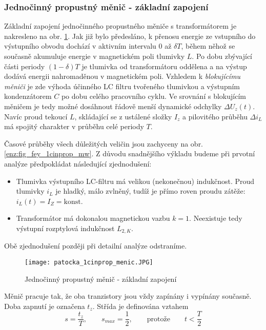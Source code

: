     \subsubsection{Jednočinný propustný měnič - základní zapojení}
      Základní zapojení jednočinného propustného měniče s transformátorem je nakresleno na obr. 
      \ref{enz:fig_fey_1cinprop_m}. Jak již bylo předesláno, k přenosu energie ze vstupního do 
      výstupního obvodu dochází v aktivním intervalu \(0\) až \(\delta T\), během něhož se současně 
      akumuluje energie v magnetickém poli tlumivky \(L\). Po dobu zbývající části periody 
      $(1-\delta)T$ je tlumivka od transformátoru oddělena a na výstup dodává energii nahromaděnou v 
      magnetickém poli. Vzhledem k \emph{blokujícímu měniči} je zde výhoda účinného LC filtru 
      tvořeného tlumivkou a výstupním kondenzátorem \(C\) po dobu celého pracovního cyklu. Ve 
      srovnání s blokujícím měničem je tedy možné dosáhnout řádově menší dynamické odchylky \(\Delta 
      U_z(t)\). Navíc proud tekoucí \(L\), skládající se z ustálené složky $I_z$ a pilovitého 
      průběhu $\Delta i_L$ má spojitý charakter v průběhu celé periody $T$. 
      
      Časové průběhy všech důležitých veličin jsou zachyceny na obr. \ref{enz:fig_fey_1cinprop_mw}. 
      Z důvodu snadnějšího výkladu budeme při prvotní analýze předpokládat následující zjednodušení:
  
      \begin{itemize}
        \item Tlumivka výstupního LC-filtru má velikou (nekonečnou) indukčnost. Proud tlumivky  
              \(i_L\) je hladký, málo zvlněný, tudíž je přímo roven proudu zátěže: \(i_L(t) = I_Z = 
              \text{konst}\).
        \item Transformátor má dokonalou magnetickou vazbu \(k=1\). Neexistuje tedy výstupní 
              rozptylová indukčnost \(L_{2,K}\).
      \end{itemize}
      Obě zjednodušení později při detailní analýze odstraníme.
      
      \begin{figure}
        \texttt{[image: patocka\_1cinprop\_menic.JPG]}
        \caption{Jednočinný propustný měnič - základní zapojení}
        \label{enz:fig_fey_1cinprop_m}
      \end{figure}
    
      Měnič pracuje tak, že oba tranzistory jsou vždy zapínány i vypínány současně. Doba zapnutí je označena
      \(t_z\). Střída je definována vztahem
      \begin{equation}\label{enz:eq_1cinpropm01}
        s = \frac{t_z}{T}, \qquad s_{max} = \frac{1}{2}, \qquad \text{protože} \qquad t<\frac{T}{2}
      \end{equation}     
  
